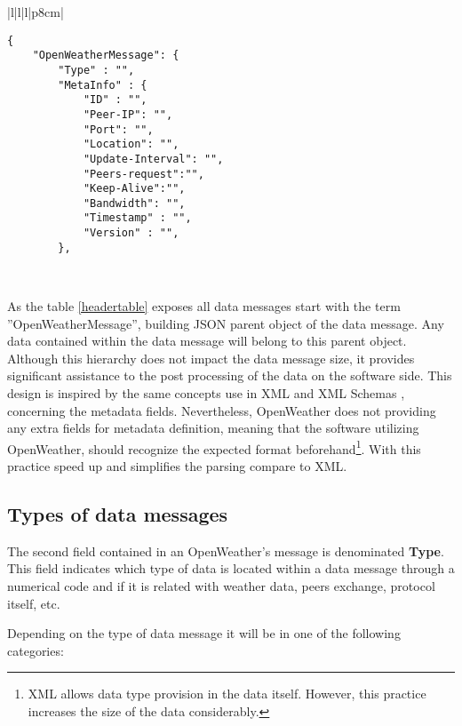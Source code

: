 \begin{table}[H]
\centering
\begin{tabular}{|l|l|l|p{8cm}|}
\hline
\begin{minipage}[t]{\linewidth}
	\begin{verbatim}
{
    "OpenWeatherMessage": {
        "Type" : "",
        "MetaInfo" : {
            "ID" : "", 
            "Peer-IP": "", 
            "Port": "",    
            "Location": "", 
            "Update-Interval": "", 
            "Peers-request":"", 
            "Keep-Alive":"", 
            "Bandwidth": "",   
            "Timestamp" : "", 
            "Version" : "",
        },
      \end{verbatim}
\end{minipage} \\
\hline
\end{tabular}
\label{headertable}
\caption{Header field (Header object) in a data message of OpenWeather.}
\end{table}

As the table \ref{headertable} exposes all data messages start with the term ''OpenWeatherMessage'', building \gls{JSON} parent object of the data message. Any data contained within the data message will belong to this parent object. Although this hierarchy does not impact the data message size, it provides significant assistance to the post processing of the data on the software side. This design is inspired by the same concepts use in \gls{XML} and \gls{XML} Schemas \cite{XML}, concerning the metadata fields. Nevertheless, OpenWeather does not providing any extra fields for metadata definition, meaning that the software utilizing OpenWeather, should recognize the expected format beforehand\footnote{\gls{XML} allows data type provision in the data itself. However, this practice increases the size of the data considerably.}. With this practice speed up and simplifies the parsing compare to \gls{XML}.

\subsection{Types of data messages}\label{types}

The second field contained in an OpenWeather's message is denominated \textbf{Type}. This field indicates which type of data is located within a data message through a numerical code and if it is related with weather data, peers exchange, protocol itself, etc.

Depending on the type of data message it will be in one of the following categories:

